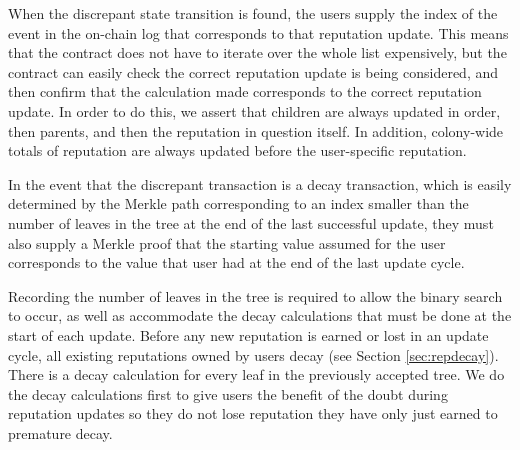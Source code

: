 When the discrepant state transition is found, the users supply the index of the event in the on-chain log that corresponds to that reputation update.  This means that the contract does not have to iterate over the whole list expensively, but the contract can easily check the correct reputation update is being considered, and then confirm that the calculation made corresponds to the correct reputation update. In order to do this, we assert that children are always updated in order, then parents, and then the reputation in question itself. In addition, colony-wide totals of reputation are always updated before the user-specific reputation.

In the event that the discrepant transaction is a decay transaction, which is easily determined by the Merkle path corresponding to an index smaller than the number of leaves in the tree at the end of the last successful update, they must also supply a Merkle proof that the starting value assumed for the user corresponds to the value that user had at the end of the last update cycle.

Recording the number of leaves in the tree is required to allow the binary search to occur, as well as accommodate the decay calculations that must be done at the start of each update. Before any new reputation is earned or lost in an update cycle, all existing reputations owned by users decay (see Section \ref{sec:repdecay}). There is a decay calculation for every leaf in the previously accepted tree. We do the decay calculations first to give users the benefit of the doubt during reputation updates so they do not lose reputation they have only just earned to premature decay.

